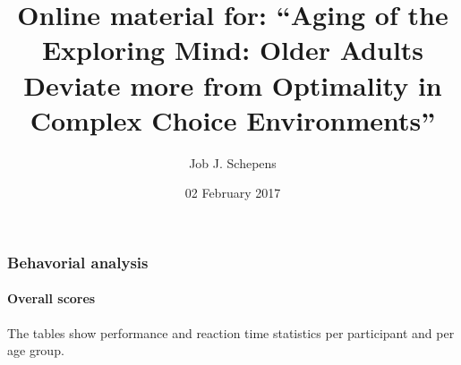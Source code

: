 \documentclass[,]{article}
\title{Online material for: ``Aging of the Exploring Mind: Older Adults Deviate
more from Optimality in Complex Choice Environments''}
\author{Job J. Schepens}
\date{02 February 2017}
\let\oldparagraph\paragraph
\renewcommand{\paragraph}[1]{\oldparagraph{#1}\mbox{}}
\begin{document}
\maketitle

{
\setcounter{tocdepth}{6}
\tableofcontents
}
\newpage

\subsubsection{Behavorial analysis}\label{behavorial-analysis}

\paragraph{Overall scores}\label{overall-scores}

The tables show performance and reaction time statistics per participant
and per age group.

\newpage 
\end{document}
